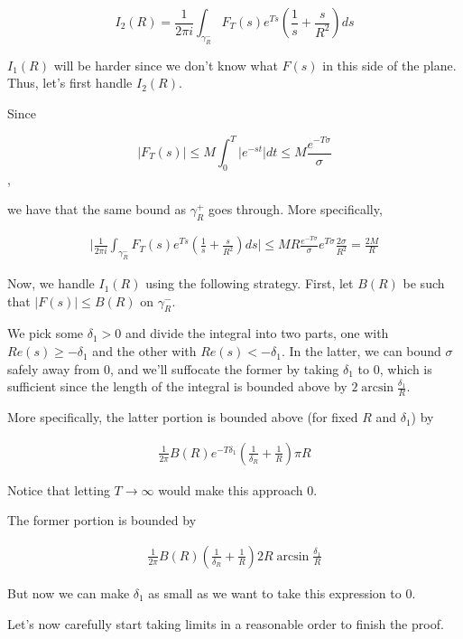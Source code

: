 \documentclass{article}
\theoremstyle{definition}
\begin{document}
\[ I_{2}(R) = \frac{1}{2 \pi i} \int_{\gamma_{R}^{-}} F_{T}(s) e^{Ts} (\frac{1}{s} + \frac{s}{R^{2}}) ds \]

$ I_{1}(R) $ will be harder since we don't know what $ F(s) $ in this side of the plane. Thus, let's first
handle $ I_{2}(R) $.

Since 

\[ \lvert F_{T}(s) \rvert \leq M \int_{0}^{T} \lvert e^{-st} \rvert dt \leq M \frac{e^{-T \sigma}}{\sigma} \],

we have that the same bound as $ \gamma_{R}^{+} $ goes through. More specifically,

\begin{align*}
    \lvert \frac{1}{2 \pi i} \int_{\gamma_{R}^{-}} F_{T}(s) e^{Ts} (\frac{1}{s} + \frac{s}{R^{2}}) ds \rvert \leq 
    MR \frac{e^{-T \sigma}}{\sigma} e^{T \sigma} \frac{2\sigma}{R^{2}} = \frac{2M}{R}
\end{align*}

Now, we handle $ I_{1}(R) $ using the following strategy.
First, let $ B(R) $ be such that $ \lvert F(s) \rvert \leq B(R) $
on $ \gamma_{R}^{-} $.

We pick some $ \delta_{1} > 0 $ and divide the integral into two parts,
one with $ Re(s) \geq - \delta_{1} $ and the other with $ Re(s) < - \delta_{1} $.
In the latter, we can bound $ \sigma $ safely away from $ 0 $, and we'll suffocate
the former by taking $ \delta_{1} $ to $ 0 $, which is sufficient since 
the length of the integral is bounded above by $ 2 \arcsin \frac{\delta_{1}}{R} $.

More specifically, the latter portion is bounded above (for fixed $ R $ and $ \delta_{1} $) by

\begin{align}\label{latter}
    \frac{1}{2\pi} B(R) e^{-T \delta_{1}} (\frac{1}{\delta_{R}} + \frac{1}{R}) \pi R
\end{align}

Notice that letting $ T \to \infty $ would make this approach $ 0 $.

The former portion is bounded by

\begin{align}\label{former}
    \frac{1}{2\pi} B(R) (\frac{1}{\delta_{R}} + \frac{1}{R}) 2 R \arcsin \frac{\delta_{1}}{R}
\end{align}

But now we can make $ \delta_{1} $ as small as we want to take this expression to $ 0 $.

Let's now carefully start taking limits in a reasonable order to finish the proof.
\end{document}
